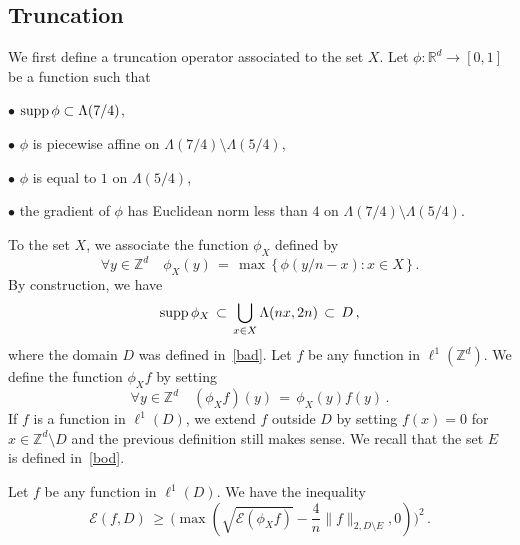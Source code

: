 \documentclass[10pt]{amsart}
\theoremstyle{definition}\newtheorem{defi}[theo]{Definition}\newtheorem{rema}[theo]{Remark}\newtheorem{exam}[theo]{Example}\newtheorem{exem}[theo]{Example}\newtheorem{nota}[theo]{Notation}
\newcommand*\supp{\text{supp\,}}
\newcommand*\Zd {{\mathbb Z^d}}
\newcommand*\Rd {{\mathbb R^d}}
\newcommand*\La {{\Lambda}}
\newcommand{\cE}{\mathcal{E}}
\let\oldforall\forall
\renewcommand*{\forall}{\mathrel{\oldforall}}
\begin{document}
\subsection{Truncation}\label{trun}
We first define a truncation operator associated to the set $X$. Let $\phi:\Rd\to [0,1]$ be a function such that

\noindent $\bullet$ $\supp\phi\subset\La(7/4)$,

\noindent $\bullet$ $\phi$ is piecewise affine on $\La(7/4)\setminus\La(5/4)$,

\noindent $\bullet$ $\phi$ is equal to $1$ on $\La(5/4)$,

\noindent $\bullet$ the gradient of $\phi$ has Euclidean norm less than $4$ on $\La(7/4)\setminus\La(5/4)$.

\noindent To the set $X$, we associate the function $\phi_X$ defined by
\[
\forall y\in\Zd\quad \phi_X(y)\,=\,\max\,\big\{\,
\phi(y/n-x): {x\in X}\,\big\}
\,.
\]
By construction, we have
\begin{equation}\label{seein}
\supp\phi_X\,\subset\,
\bigcup_{x\in X}\Lambda(nx,2n)\,\subset\, D\,,
\end{equation}
where the domain $D$ was defined in~\eqref{bad}. Let $f$ be any function in $\ell^1(\Zd)$. We define the function $\phi_Xf$ by setting
\[
\forall y\in\Zd
\quad (\phi_Xf)(y)\,=\,\phi_X(y) f(y)\,.
\]
If $f$ is a function in $\ell^1(D)$, we extend $f$ outside $D$ by setting $f(x)=0$ for $x\in\Zd\setminus D$ and the previous definition still makes sense. We recall that the set $E$ is defined in~\eqref{bod}.
\begin{prop}\label{depa}
Let $f$ be any function in $\ell^1(D)$. We have the inequality
\[
\cE(f,D)\,\geq\,\Bigg(
\max\left(\sqrt{\cE(\phi_Xf)}-
\frac{4}{n}
\|f\|_{2,D\setminus E},0\right)\Bigg)^2\,.
\]
\end{prop}
\end{document}
